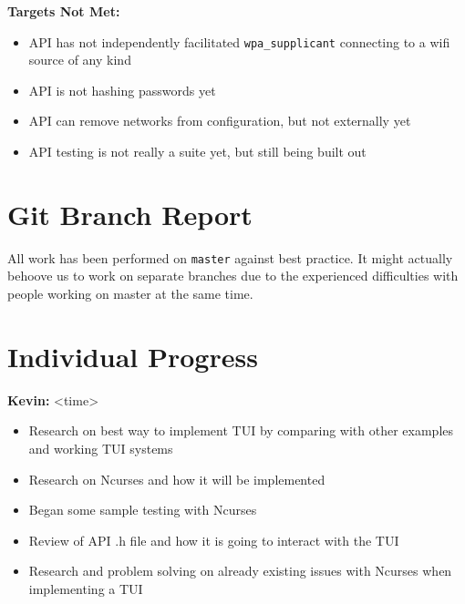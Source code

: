 \documentclass[11pt]{article}
\begin{document}
\textbf{Targets Not Met:}
\begin{itemize}
  \item API has not independently facilitated \texttt{wpa\_supplicant} connecting to a wifi source of any kind
  \item API is not hashing passwords yet
  \item API can remove networks from configuration, but not externally yet
  \item API testing is not really a suite yet, but still being built out
\end{itemize}


\section{Git Branch Report}
All work has been performed on \texttt{master} against best practice. It might actually behoove us to
work on separate branches due to the experienced difficulties with people working on master at the same
time.


\section{Individual Progress}

\textbf{Kevin:} <time>
\begin{itemize}
  \item Research on best way to implement TUI by comparing with other examples and working TUI systems
  \item Research on Ncurses and how it will be implemented 
  \item Began some sample testing with Ncurses 
  \item Review of API .h file and how it is going to interact with the TUI
  \item Research and problem solving on already existing issues with Ncurses when implementing a TUI
\end{itemize}
\end{document}
